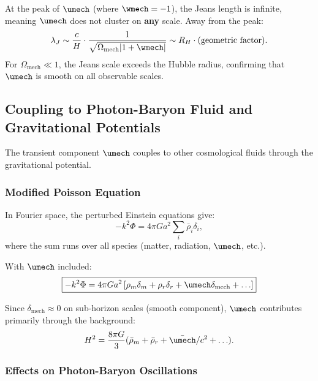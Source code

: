 \begin{proposition}
\label{prop:jeans_mech}
At the peak of $\umech$ (where $\wmech = -1$), the Jeans length is infinite, meaning $\umech$ does not cluster on \textbf{any} scale. Away from the peak:
\begin{equation}
\lambda_J \sim \frac{c}{H} \cdot \frac{1}{\sqrt{\Omega_{\mathrm{mech}}|1+\wmech|}} \sim R_H \cdot (\text{geometric factor}).
\end{equation}
For $\Omega_{\mathrm{mech}} \ll 1$, the Jeans scale exceeds the Hubble radius, confirming that $\umech$ is smooth on all observable scales.
\end{proposition}

\subsection{Coupling to Photon-Baryon Fluid and Gravitational Potentials}
\label{sec:coupling}

The transient component $\umech$ couples to other cosmological fluids through the gravitational potential.

\subsubsection{Modified Poisson Equation}

In Fourier space, the perturbed Einstein equations give:
\begin{equation}
\label{eq:poisson_perturbed}
-k^2\Phi = 4\pi G a^2 \sum_i \bar{\rho}_i \delta_i,
\end{equation}
where the sum runs over all species (matter, radiation, $\umech$, etc.).

With $\umech$ included:
\begin{equation}
\boxed{-k^2\Phi = 4\pi G a^2 \left[ \rho_m \delta_m + \rho_r \delta_r + \umech \delta_{\mathrm{mech}} + \ldots \right]}
\end{equation}

Since $\delta_{\mathrm{mech}} \approx 0$ on sub-horizon scales (smooth component), $\umech$ contributes primarily through the background:
\begin{equation}
H^2 = \frac{8\pi G}{3}(\bar{\rho}_m + \bar{\rho}_r + \bar{\umech}/c^2 + \ldots).
\end{equation}

\subsubsection{Effects on Photon-Baryon Oscillations}

